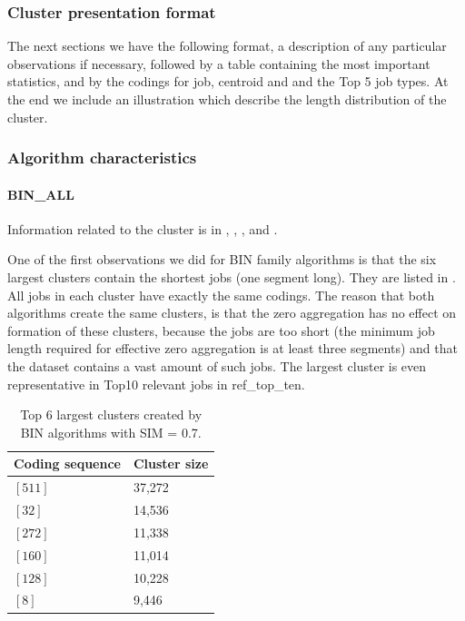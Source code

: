 \documentclass[]{llncs}
\begin{document}
\subsubsection{Cluster presentation format}

The next sections we have the following format, a description of any particular observations if necessary, followed by a table containing the most important statistics, and by the codings for job, centroid and and the Top 5 job types.
At the end we include an illustration which describe the length distribution of the cluster.


\subsubsection{Algorithm characteristics}
\paragraph{BIN\_ALL}
Information related to the cluster is in , , , and .

One of the first observations we did for BIN family algorithms is that the six largest clusters contain the shortest jobs (one segment long).
They are listed in .
All jobs in each cluster have exactly the same codings.
The reason that both algorithms create the same clusters, is that the zero aggregation has no effect on formation of these clusters, because the jobs are too short (the minimum job length required for effective zero aggregation is at least three segments) and that the dataset contains a vast amount of such jobs.
The largest cluster is even representative in Top10 relevant jobs in ref\_top\_ten.

\begin{table}
  \centering
  \begin{tabular}{ll}
    Coding sequence & Cluster size \\
    \hline
		$[511]$ &  37,272 \\
		$[32]$ &  14,536 \\
		$[272]$ &  11,338 \\
    $[160]$ &  11,014 \\
    $[128]$ &  10,228 \\
    $[8]$ &  9,446 \\
  \end{tabular}
  \caption{Top 6 largest clusters created by BIN algorithms with SIM = 0.7.}
  \label{tab:bin:largest_clusters}
\end{table}
\end{document}
